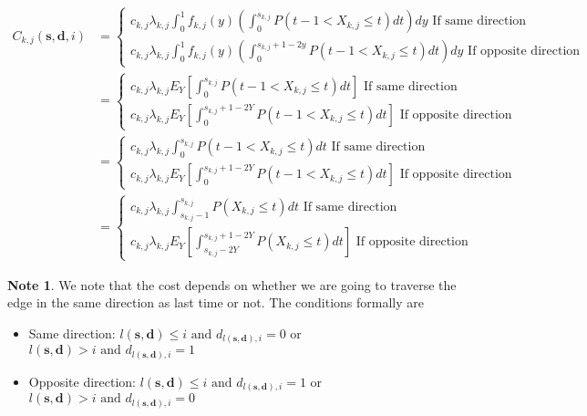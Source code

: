 \documentclass[a4paper,10pt]{article}
\theoremstyle{definition}
\theoremstyle{definition}
\theoremstyle{remark}
\theoremstyle{definition}
\newtheorem*{note}{Note}
\begin{document}
\begin{align}
C_{k,j}(\bm{s},\bm{d},i)&= \begin{cases}
c_{k,j} \lambda_{k,j} \int_{0}^{1} f_{k,j}(y) \left(\int_{0}^{s_{k,j}} P(t-1 < X_{k,j} \leq t) dt \right) dy \text{ If same direction}\\
c_{k,j} \lambda_{k,j} \int_{0}^{1} f_{k,j}(y) \left(\int_{0}^{s_{k,j}+1-2y} P(t-1 < X_{k,j} \leq t) dt \right) dy \text{ If opposite direction}
\end{cases} \nonumber \\
&= \begin{cases}
c_{k,j} \lambda_{k,j} E_{Y} \left[\int_{0}^{s_{k,j}} P(t-1 < X_{k,j} \leq t) dt \right] \text{ If same direction}\\
c_{k,j} \lambda_{k,j} E_{Y} \left[\int_{0}^{s_{k,j}+1-2Y} P(t-1 < X_{k,j} \leq t) dt \right] \text{ If opposite direction}
\end{cases} \nonumber \\
&= \begin{cases}
c_{k,j} \lambda_{k,j} \int_{0}^{s_{k,j}} P(t-1 < X_{k,j} \leq t) dt \text{ If same direction}\\
c_{k,j} \lambda_{k,j} E_{Y} \left[\int_{0}^{s_{k,j}+1-2Y} P(t-1 < X_{k,j} \leq t) dt \right] \text{ If opposite direction}
\end{cases} \nonumber \\
&= \begin{cases}
c_{k,j} \lambda_{k,j} \int_{s_{k,j}-1}^{s_{k,j}} P(X_{k,j} \leq t) dt \text{ If same direction}\\
c_{k,j} \lambda_{k,j} E_{Y} \left[\int_{s_{k,j}-2Y}^{s_{k,j}+1-2Y} P(X_{k,j} \leq t) dt \right] \text{ If opposite direction}
\end{cases}
\end{align}


\begin{note}
We note that the cost depends on whether we are going to traverse the edge in the same direction as last time or not. The conditions formally are
\begin{itemize}
\item Same direction:
$ l(\bm{s},\bm{d}) \leq i  \text{ and } d_{l(\bm{s},\bm{d}),i}=0$
or
$ l(\bm{s},\bm{d}) > i \text{ and } d_{l(\bm{s},\bm{d}),i}=1$
\item Opposite direction:
$ l(\bm{s},\bm{d}) \leq i  \text{ and } d_{l(\bm{s},\bm{d}),i}=1$
or
$ l(\bm{s},\bm{d}) > i  \text{ and } d_{l(\bm{s},\bm{d}),i}=0$
\end{itemize}
\end{note}
 
\end{document}
